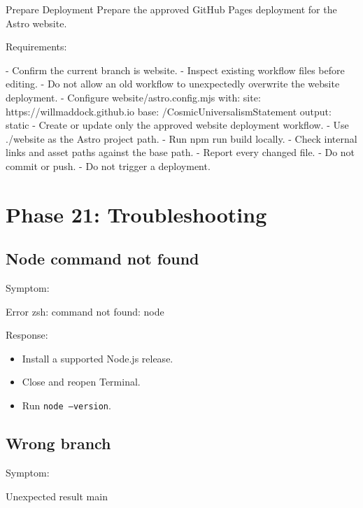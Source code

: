 \documentclass[11pt,letterpaper]{article}
\begin{document}
\begin{promptbox}{Prepare Deployment}
Prepare the approved GitHub Pages deployment for the Astro website.

Requirements:

- Confirm the current branch is website.
- Inspect existing workflow files before editing.
- Do not allow an old workflow to unexpectedly overwrite the
  website deployment.
- Configure website/astro.config.mjs with:
  site: https://willmaddock.github.io
  base: /CosmicUniversalismStatement
  output: static
- Create or update only the approved website deployment workflow.
- Use ./website as the Astro project path.
- Run npm run build locally.
- Check internal links and asset paths against the base path.
- Report every changed file.
- Do not commit or push.
- Do not trigger a deployment.
\end{promptbox}

\section{Phase 21: Troubleshooting}

\subsection{Node command not found}

Symptom:

\begin{codebox}{Error}
zsh: command not found: node
\end{codebox}

Response:

\begin{itemize}
    \item Install a supported Node.js release.
    \item Close and reopen Terminal.
    \item Run \texttt{node --version}.
\end{itemize}

\subsection{Wrong branch}

Symptom:

\begin{codebox}{Unexpected result}
main
\end{codebox}
\end{document}
